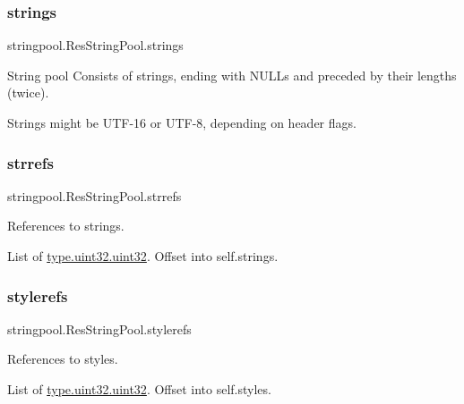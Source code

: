 \subsubsection{\texorpdfstring{strings}{strings}}
{\footnotesize\ttfamily stringpool.\+Res\+String\+Pool.\+strings}



String pool Consists of strings, ending with N\+U\+L\+Ls and preceded by their lengths (twice). 

Strings might be U\+T\+F-\/16 or U\+T\+F-\/8, depending on header flags. \mbox{\label{classstringpool_1_1ResStringPool_a7cd43d8421ba9f2060ad5555637245c6}} 
\subsubsection{\texorpdfstring{strrefs}{strrefs}}
{\footnotesize\ttfamily stringpool.\+Res\+String\+Pool.\+strrefs}



References to strings. 

List of \mbox{\hyperlink{classtype_1_1uint32_1_1uint32}{type.\+uint32.\+uint32}}. Offset into self.\+strings. \mbox{\label{classstringpool_1_1ResStringPool_a28ab464baab495dadcface0abb9b9839}} 
\subsubsection{\texorpdfstring{stylerefs}{stylerefs}}
{\footnotesize\ttfamily stringpool.\+Res\+String\+Pool.\+stylerefs}



References to styles. 

List of \mbox{\hyperlink{classtype_1_1uint32_1_1uint32}{type.\+uint32.\+uint32}}. Offset into self.\+styles. \mbox{\label{classstringpool_1_1ResStringPool_aebb7e52f22773bb87fc71dc79be2fb2f}} 
